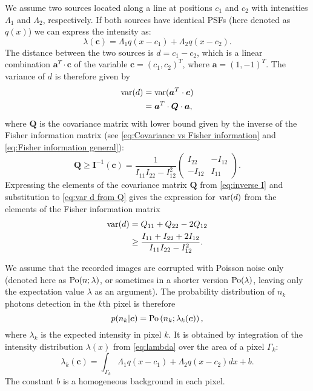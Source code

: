 We assume two sources located along a line at positions $c_1$ and $c_2$ with intensities $\Lambda_1$ and $\Lambda_2$, respectively. If both sources have identical PSFs (here denoted as $q(x)$) we can express the intensity as:
%
\begin{equation}
	\lambda(\bm{c})=\Lambda_1q(x-c_1)+\Lambda_2q(x-c_2).
	\label{eq:lambda}
\end{equation}
%
The distance between the two sources is $d=c_1-c_2$, which is a linear combination $\bm{a}^{T}\cdot\bm{c}$ of the variable $\bm{c}=(c_1,c_2)^{T}$, where $\bm{a}=(1,-1)^{T}$. The variance of $d$ is therefore given by 
%
\begin{alignat}{2}
	\mathrm{var}(d)
	&=\mathrm{var}(\bm{a}^{T}\cdot\bm{c})\nonumber\\
	&=\bm{a}^{T}\cdot\bm{Q}\cdot\bm{a},
	\label{eq:var d from Q}
\end{alignat}
%
where $\bm{Q}$ is the covariance matrix with lower bound given by the inverse of the Fisher information matrix (see \autoref{eq:Covariance vs Fisher information} and \autoref{eq:Fisher information general}):
%
\begin{equation}
	\bm{Q}\geq\bm{I}^{-1}(\bm{c})=\frac{1}{I_{11}I_{22}-I_{12}^2}\left(
	\begin{array}{cc}
		I_{22} & -I_{12}\\
		-I_{12} & I_{11}
	\end{array}\right).
	\label{eq:inverse I}
\end{equation}
%
Expressing the elements of the covariance matrix $\bm{Q}$ from \autoref{eq:inverse I} and substitution to \autoref{eq:var d from Q} gives the expression for $\mathrm{var}(d)$ from the elements of the Fisher information matrix
%
\begin{alignat}{2}
	\mathrm{var}(d)
	&=Q_{11}+Q_{22}-2Q_{12}\nonumber\\
	&\geq\frac{I_{11}+I_{22}+2I_{12}}{I_{11}I_{22}-I_{12}^2}.
	\label{eq:variance d alternative}
\end{alignat}

We assume that the recorded images are corrupted with Poisson noise only (denoted here as $\mathrm{Po}(n;\lambda)$, or sometimes in a shorter version $\mathrm{Po}(\lambda)$, leaving only the expectation value $\lambda$ as an argument). The probability distribution of $n_k$ photons detection in the $k$th pixel is therefore
%
\begin{equation}
	p(n_k|\bm{c})=\mathrm{Po}\left(n_k;\lambda_k(\bm{c})\right),
\end{equation}
%
where $\lambda_k$ is the expected intensity in pixel $k$. It is obtained by integration of the intensity distribution $\lambda(x)$ from \autoref{eq:lambda} over the area of a pixel $\Gamma_k$:
%
\begin{equation}
	\lambda_k(\bm{c})=\int_{\Gamma_k}\Lambda_1q(x-c_1)+\Lambda_2q(x-c_2)dx+b.	
	\label{eq:intensity pixel}
\end{equation}
%
The constant $b$ is a homogeneous background in each pixel.

